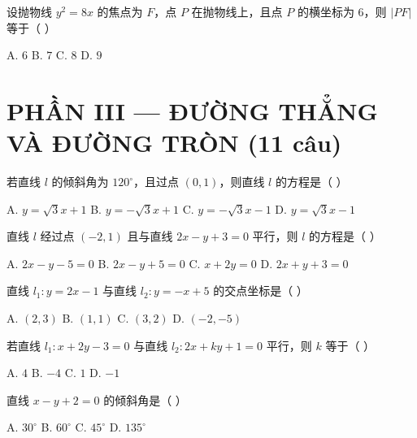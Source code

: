 \documentclass[11pt, a4paper]{article}
\begin{document}
\begin{baitap}[25]
设抛物线 $y^2=8x$ 的焦点为 $F$，点 $P$ 在抛物线上，且点 $P$ 的横坐标为 $6$，则 $\lvert PF\rvert$ 等于（ ）
\par\vspace{3pt}
\noindent A. $6$ \quad B. $7$ \quad C. $8$ \quad D. $9$
\end{baitap}

\section{PHẦN III — ĐƯỜNG THẲNG VÀ ĐƯỜNG TRÒN (11 câu)}

\begin{baitap}[26]
若直线 $l$ 的倾斜角为 $120^\circ$，且过点 $(0,1)$，则直线 $l$ 的方程是（ ）
\par\vspace{3pt}
\noindent A. $y=\sqrt{3}x+1$ \quad B. $y=-\sqrt{3}x+1$ \quad C. $y=-\sqrt{3}x-1$ \quad D. $y=\sqrt{3}x-1$
\end{baitap}

\begin{baitap}[27]
直线 $l$ 经过点 $(-2,1)$ 且与直线 $2x-y+3=0$ 平行，则 $l$ 的方程是（ ）
\par\vspace{3pt}
\noindent A. $2x-y-5=0$ \quad B. $2x-y+5=0$ \quad C. $x+2y=0$ \quad D. $2x+y+3=0$
\end{baitap}

\begin{baitap}[28]
直线 $l_1:y=2x-1$ 与直线 $l_2:y=-x+5$ 的交点坐标是（ ）
\par\vspace{3pt}
\noindent A. $(2,3)$ \quad B. $(1,1)$ \quad C. $(3,2)$ \quad D. $(-2,-5)$
\end{baitap}

\begin{baitap}[29]
若直线 $l_1:x+2y-3=0$ 与直线 $l_2:2x+ky+1=0$ 平行，则 $k$ 等于（ ）
\par\vspace{3pt}
\noindent A. $4$ \quad B. $-4$ \quad C. $1$ \quad D. $-1$
\end{baitap}

\begin{baitap}[30]
直线 $x-y+2=0$ 的倾斜角是（ ）
\par\vspace{3pt}
\noindent A. $30^\circ$ \quad B. $60^\circ$ \quad C. $45^\circ$ \quad D. $135^\circ$
\end{baitap}
\end{document}
